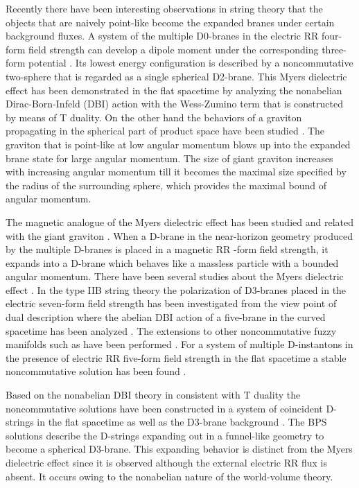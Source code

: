 \documentclass[12pt,a4paper]{article}
\begin{document}
Recently there have been interesting observations in string theory that
the objects that are naively point-like become the expanded branes 
under certain background fluxes. A system of the multiple D0-branes in
the electric RR four-form field strength can develop a dipole moment
under the corresponding three-form potential \cite{RCM,TR}. Its lowest 
energy configuration is described by a noncommutative two-sphere that is
regarded as a single spherical D2-brane.  This Myers dielectric effect 
has been demonstrated in the flat spacetime by analyzing 
the nonabelian Dirac-Born-Infeld (DBI) action with the Wess-Zumino 
term that is constructed by means of T duality.  
On the other hand the behaviors of a graviton propagating in the
spherical part of product space \coordHE{} 
have been studied \cite{MST}.
The graviton that is point-like at low angular momentum blows up into the
expanded brane state for large angular momentum. The size of giant 
graviton increases with increasing angular momentum till it becomes
the maximal size specified by the radius of the surrounding sphere, 
which provides the maximal bound of angular momentum. 

The magnetic analogue of the Myers dielectric effect has been studied and
related with the giant graviton \cite{DTV}.
When a D\coordHE{}-brane in the near-horizon geometry produced by the multiple
D\coordHE{}-branes is placed in a magnetic RR \coordHE{}-form field strength,
it expands into a D\coordHE{}-brane which behaves like a massless particle
with a bounded angular momentum. There have been several studies about the
Myers dielectric effect \cite{PS,TV,GJS,IB}.
In the type IIB string theory the polarization
of D3-branes placed in the electric seven-form field strength has been
investigated from the view point of dual description where the 
abelian DBI action of a five-brane in the \coordHE{} curved 
spacetime has been analyzed \cite{PS}.
The extensions to other noncommutative fuzzy manifolds such as 
\coordHE{} have been performed \cite{TV}.
For a system of multiple D-instantons in the presence of electric RR
five-form field strength in the flat spacetime a stable noncommutative
solution has been found \cite{GJS}.

Based on the nonabelian DBI theory in consistent with T duality 
the noncommutative solutions have been constructed in a system of \coordHE{}
coincident D-strings in the flat spacetime as well as the D3-brane
background \cite{CMT}. The BPS solutions describe 
the D-strings expanding out in
a funnel-like geometry to become a spherical D3-brane. 
This expanding behavior is distinct from the Myers dielectric effect
since it is observed although the external electric RR flux is absent.
It occurs owing to the nonabelian nature of the world-volume theory.
\end{document}
